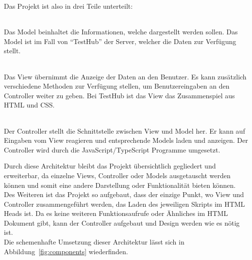 Das Projekt ist also in drei Teile unterteilt:
\begin{description}
    \hfill\\
    Das Model beinhaltet die Informationen, welche dargestellt werden sollen. Das
    Model ist im Fall von ``TestHub'' der Server, welcher die Daten zur Verfügung stellt.

    \hfill\\
    Das View übernimmt die Anzeige der Daten an den Benutzer. Es kann zusätzlich
    verschiedene Methoden zur Verfügung stellen, um Benutzereingaben an den Controller
    weiter zu geben. Bei TestHub ist das View das Zusammenspiel aus \gls{HTML} und \gls{CSS}.

    \hfill\\
    Der Controller stellt die Schnittstelle zwischen View und Model her. Er kann 
    auf Eingaben vom View reagieren und entsprechende Models laden und anzeigen.
    Der Controller wird durch die JavaScript/TypeScript Programme umgesetzt.
\end{description}

Durch diese Architektur bleibt das Projekt übersichtlich gegliedert und erweiterbar, 
da einzelne Views, Controller oder Models ausgetauscht werden können und somit eine andere 
Darstellung oder Funktionalität bieten können. Des Weiteren ist das Projekt so 
aufgebaut, dass der einzige Punkt, wo View und Controller zusammengeführt werden,
das Laden des jeweiligen Skripts im \gls{HTML} Heads ist. Da es keine weiteren 
Funktionsaufrufe oder Ähnliches im \gls{HTML} Dokument gibt, kann der Controller
aufgebaut und Design werden wie es nötig ist. \\

Die schemenhafte Umsetzung dieser Architektur lässt sich in Abbildung~\ref{fig:components}
wiederfinden.

